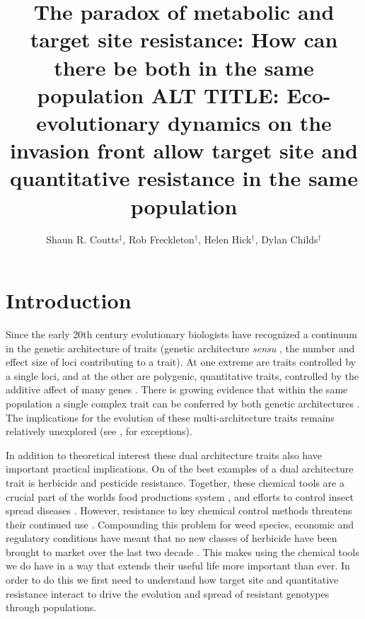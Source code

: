 \documentclass[12pt, a4paper]{article}
\begin{document}
\title{The paradox of metabolic and target site resistance: How can there be both in the same population ALT TITLE: Eco-evolutionary dynamics on the invasion front allow target site and quantitative resistance in the same population}
\author{Shaun R. Coutts$^\ddag$, Rob Freckleton$^\dag$, Helen Hick$^\dag$, Dylan Childs$^\dag$}
\maketitle

\newpage

\section{Introduction}
Since the early 20th century evolutionary biologists have recognized a continuum in the genetic architecture of traits (genetic architecture \textit{sensu} \citealt{Deba2015}, the number and effect size of loci contributing to a trait). At one extreme are traits controlled by a single loci, and at the other are polygenic, quantitative traits, controlled by the additive affect of many genes \citep{Land1989, Mack2009, Rajo2013}. There is growing evidence that within the same population a single complex trait can be conferred by both genetic architectures \citep{Donn2009, Bing2011, Hend2013, Oake2013, Bauc2016}. The implications for the evolution of these multi-architecture traits remains relatively unexplored (see \citealt{Deba2015}, \citealt{Yeam2015} for exceptions). 

In addition to theoretical interest these dual architecture traits also have important practical implications. On of the best examples of a dual architecture trait is herbicide and pesticide resistance. Together, these chemical tools are a crucial part of the worlds food productions system \citep{Duke2012}, and efforts to control insect spread diseases \citep{Nkya2013}. However, resistance to key chemical control methods threatens their continued use \citep{Barb2011, Nkya2013}. Compounding this problem for weed species, economic and regulatory conditions have meant that no new classes of herbicide have been brought to market over the last two decade \citep{Duke2012}. This makes using the chemical tools we do have in a way that extends their useful life more important than ever. In order to do this we first need to understand how target site and quantitative resistance interact to drive the evolution and spread of resistant genotypes through populations. 
\end{document}
